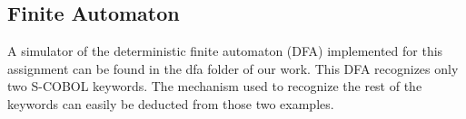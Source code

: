 \subsection{Finite Automaton}
A simulator of the deterministic finite automaton (DFA) implemented for this assignment can be found in the dfa  folder of our work. This DFA recognizes only two S-COBOL keywords. The mechanism used to recognize the rest of the keywords can easily be deducted from those two examples.